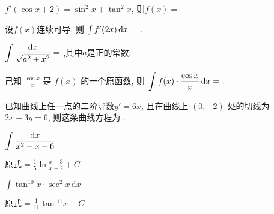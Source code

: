 \begin{problem}$f'(\cos x +2) = \sin^2 x + \tan^2 x$, 则$f\left( x \right) =$ 

\end{problem}           

\begin{problem} 设$f(x)$连续可导, 则 $\int f'(2x)\mathop{}\!\mathrm{d} x =$ 
.

\end{problem}           

\begin{problem} $\displaystyle \int \frac{\mathop{}\!\mathrm{d} x}{\sqrt{a^{2} + x^{2}}} =$ 
,其中$a$是正的常数.
\end{problem}           


\begin{problem} 己知 $\displaystyle \frac{\cos x}{x}$ 是 $f(x)$ 的一个原函数, 则
$\displaystyle \int f(x) \cdot \frac{\cos x}{x}\mathop{}\!\mathrm{d} x =$ 
.

\end{problem}           

\begin{problem} 已知曲线上任一点的二阶导数$y' = 6x$, 且在曲线上 $(0,-2)$ 处的切线为
$2 x - 3 y = 6$, 则这条曲线方程为 
.
\end{problem}



\begin{problem}
	$\displaystyle \int \frac{\mathop{}\!\mathrm{d} x}{x^{2} - x - 6}$
	
	\begin{solution}
		$\text{原式}\displaystyle = \frac{1}{5}\ln\frac{x - 3}{x + 2} + C$
	\end{solution}
\end{problem}



 \begin{problem}
 	$\displaystyle\int \tan^{10} x \cdot \sec^2x\, \mathrm{d}x$

\begin{solution}
	$\text{原式}\displaystyle = \frac{1}{11}\tan{}^{11}x + C$
\end{solution}
 \end{problem}


